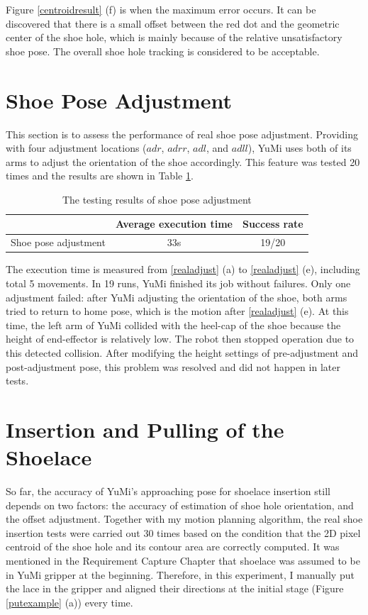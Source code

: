 Figure \ref{centroidresult} (f) is when the maximum error occurs. It can be discovered that there is a small offset between the red dot and the geometric center of the shoe hole, which is mainly because of the relative unsatisfactory shoe pose. The overall shoe hole tracking is considered to be acceptable.

\section{Shoe Pose Adjustment}
This section is to assess the performance of real shoe pose adjustment. Providing with four adjustment locations ($adr$, $adrr$, $adl$, and $adll$), YuMi uses both of its arms to adjust the orientation of the shoe accordingly. This feature was tested 20 times and the results are shown in Table \ref{adjusttest}.

\begin{table}[H]
\centering
\begin{tabular}{||c||c|c||}
\hline
 & Average execution time & Success rate \\ \hline \hline
Shoe pose adjustment & 33s & 19/20 \\ \hline
\end{tabular}
\caption{The testing results of shoe pose adjustment}
\label{adjusttest}
\end{table}

The execution time is measured from \ref{realadjust} (a) to \ref{realadjust} (e), including total 5 movements. In 19 runs, YuMi finished its job without failures. Only one adjustment failed: after YuMi adjusting the orientation of the shoe, both arms tried to return to home pose, which is the motion after \ref{realadjust} (e). At this time, the left arm of YuMi collided with the heel-cap of the shoe because the height of end-effector is relatively low. The robot then stopped operation due to this detected collision. After modifying the height settings of pre-adjustment and post-adjustment pose, this problem was resolved and did not happen in later tests.


\section{Insertion and Pulling of the Shoelace}
So far, the accuracy of YuMi's approaching pose for shoelace insertion still depends on two factors: the accuracy of estimation of shoe hole orientation, and the offset adjustment. Together with my motion planning algorithm, the real shoe insertion tests were carried out 30 times based on the condition that the 2D pixel centroid of the shoe hole and its contour area are correctly computed. It was mentioned in the Requirement Capture Chapter that shoelace was assumed to be in YuMi gripper at the beginning. Therefore, in this experiment, I manually put the lace in the gripper and aligned their directions at the initial stage (Figure \ref{putexample} (a)) every time.

